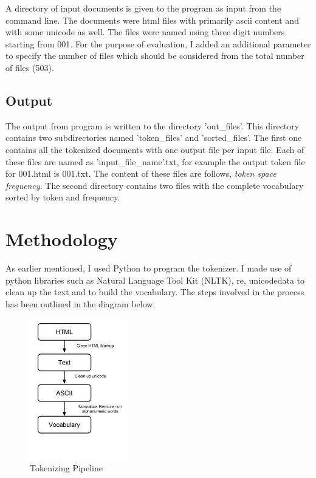 \documentclass[11pt]{article} %
\begin{document}
A directory of input documents is given to the program as input from the command line. The documents were html files with primarily ascii content and with some unicode as well. The files were named using three digit numbers starting from 001. For the purpose of evaluation, I added an additional parameter to specify the number of files which should be considered from the total number of files (503).


\subsection{Output} %

The output from program is written to the directory 'out\_files'. This directory contains two subdirectories named 'token\_files' and 'sorted\_files'. The first one contains all the tokenized documents with one output file per input file. Each of these files are named as 'input\_file\_name'.txt, for example the output token file for 001.html is 001.txt. The content of these files are follows, \textit{token {space} frequency}. The second directory contains two files with the complete vocabulary sorted by token and frequency. 

\section{Methodology} %

As earlier mentioned, I used Python to program the tokenizer. I made use of python libraries such as Natural Language Tool Kit (NLTK), re, unicodedata to clean up the text and to build the vocabulary. The steps involved in the process has been outlined in the diagram below.

\begin{figure}[h] %
  \begin{center}
    \includegraphics[width=0.38\textwidth]{method.jpg}
  \end{center}
  \caption{Tokenizing Pipeline}
\end{figure}
\end{document}
